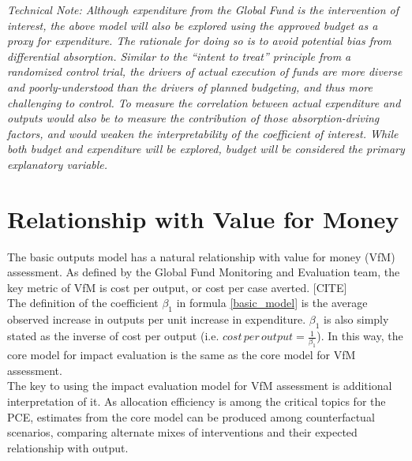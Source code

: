 \documentclass[twocolumn]{bmcart}%
\begin{document}
\textit{Technical Note: Although expenditure from the Global Fund is the intervention of interest, the above model will also be explored using the approved budget as a proxy for expenditure. The rationale for doing so is to avoid potential bias from differential absorption. Similar to the ``intent to treat'' principle from a randomized control trial, the drivers of actual execution of funds are more diverse and poorly-understood than the drivers of planned budgeting, and thus more challenging to control. To measure the correlation between actual expenditure and outputs would also be to measure the contribution of those absorption-driving factors, and would weaken the interpretability of the coefficient of interest. While both budget and expenditure will be explored, budget will be considered the primary explanatory variable.}


\section{Relationship with Value for Money} \label{vfm}
The basic outputs model has a natural relationship with value for money (VfM) assessment. As defined by the Global Fund Monitoring and Evaluation team, the key metric of VfM is cost per output, or cost per case averted. [CITE] \\

The definition of the coefficient $\beta_1$ in formula \ref{basic_model} is the average observed increase in outputs per unit increase in expenditure. $\beta_1$ is also simply stated as the inverse of cost per output (i.e. $cost\, per\, output = \frac{1}{\beta_1}$). In this way, the core model for impact evaluation is the same as the core model for VfM assessment. \\

The key to using the impact evaluation model for VfM assessment is additional interpretation of it. As allocation efficiency is among the critical topics for the PCE, estimates from the core model can be produced among counterfactual scenarios, comparing alternate mixes of interventions and their expected relationship with output.


\clearpage
\end{document}
